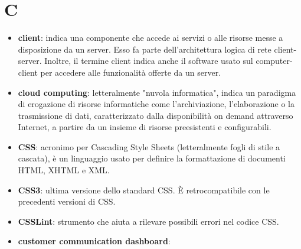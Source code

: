\section{C}
\begin{itemize}
	\item \textbf{client}: indica una componente che accede ai servizi o alle risorse messe a disposizione da un server. Esso fa parte dell'architettura logica di rete client-server. Inoltre, il termine client indica anche il software usato sul computer-client per accedere alle funzionalità offerte da un server.
	\item \textbf{cloud computing}: letteralmente "nuvola informatica", indica un paradigma di erogazione di risorse informatiche come l'archiviazione, l'elaborazione o la trasmissione di dati, caratterizzato dalla disponibilità on demand attraverso Internet, a partire da un insieme di risorse preesistenti e configurabili.
	\item \textbf{CSS}: acronimo per Cascading Style Sheets (letteralmente fogli di stile a cascata), è un linguaggio usato per definire la formattazione di documenti HTML, XHTML e XML.
	\item \textbf{CSS3}: ultima versione dello standard CSS. \MakeUppercase{è} retrocompatibile con le precedenti versioni di CSS.
	\item \textbf{CSSLint}: strumento che aiuta a rilevare possibili errori nel codice CSS.
	\item \textbf{customer communication dashboard}:
\end{itemize}